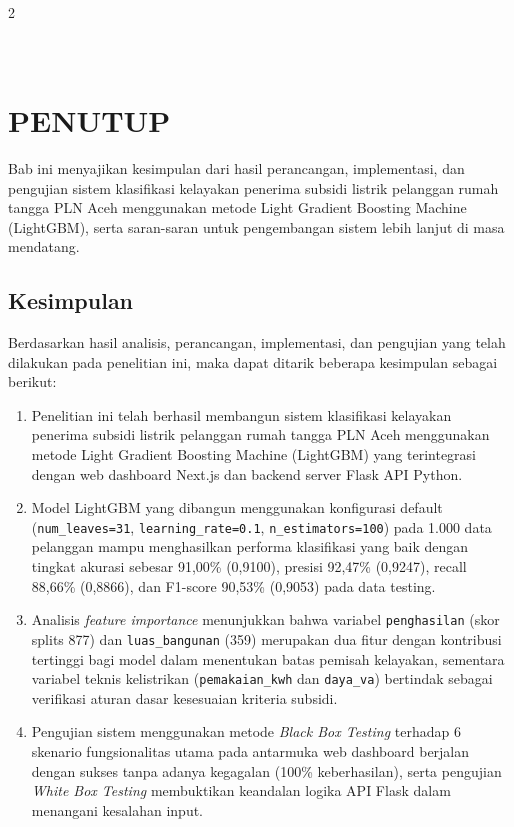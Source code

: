 \documentclass[12pt, a4paper, onecolumn, oneside]{report}
\begin{document}
\begin{spacing}{2}
\chapter[PENUTUP]{\\ PENUTUP}

Bab ini menyajikan kesimpulan dari hasil perancangan, implementasi, dan pengujian sistem klasifikasi kelayakan penerima subsidi listrik pelanggan rumah tangga PLN Aceh menggunakan metode Light Gradient Boosting Machine (LightGBM), serta saran-saran untuk pengembangan sistem lebih lanjut di masa mendatang.

\section{Kesimpulan}
Berdasarkan hasil analisis, perancangan, implementasi, dan pengujian yang telah dilakukan pada penelitian ini, maka dapat ditarik beberapa kesimpulan sebagai berikut:
\begin{enumerate}
    \item Penelitian ini telah berhasil membangun sistem klasifikasi kelayakan penerima subsidi listrik pelanggan rumah tangga PLN Aceh menggunakan metode Light Gradient Boosting Machine (LightGBM) yang terintegrasi dengan web dashboard Next.js dan backend server Flask API Python.
    \item Model LightGBM yang dibangun menggunakan konfigurasi default (\texttt{num\_leaves=31}, \texttt{learning\_rate=0.1}, \texttt{n\_estimators=100}) pada 1.000 data pelanggan mampu menghasilkan performa klasifikasi yang baik dengan tingkat akurasi sebesar 91,00\% (0,9100), presisi 92,47\% (0,9247), recall 88,66\% (0,8866), dan F1-score 90,53\% (0,9053) pada data testing.
    \item Analisis \textit{feature importance} menunjukkan bahwa variabel \texttt{penghasilan} (skor splits 877) dan \texttt{luas\_bangunan} (359) merupakan dua fitur dengan kontribusi tertinggi bagi model dalam menentukan batas pemisah kelayakan, sementara variabel teknis kelistrikan (\texttt{pemakaian\_kwh} dan \texttt{daya\_va}) bertindak sebagai verifikasi aturan dasar kesesuaian kriteria subsidi.
    \item Pengujian sistem menggunakan metode \textit{Black Box Testing} terhadap 6 skenario fungsionalitas utama pada antarmuka web dashboard berjalan dengan sukses tanpa adanya kegagalan (100\% keberhasilan), serta pengujian \textit{White Box Testing} membuktikan keandalan logika API Flask dalam menangani kesalahan input.
\end{enumerate}


\end{spacing}
\end{document}
